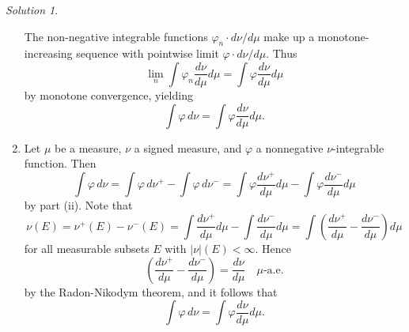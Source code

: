 \documentclass{report}
\theoremstyle{remark}
\newtheorem*{solution}{Solution}
\begin{document}
\begin{solution}
\begin{enumerate}[label=(\roman*)]
      The non-negative integrable functions $\varphi_n \cdot d\nu/d\mu$ make up a monotone-increasing sequence with pointwise limit $\varphi \cdot d\nu/d\mu$. Thus
      \begin{equation*}
        \lim_n \int \varphi_n \frac{d\nu}{d\mu} d\mu = \int \varphi \frac{d\nu}{d\mu} d\mu
      \end{equation*}
      by monotone convergence, yielding
      \begin{equation*}
        \int \varphi \, d\nu = \int \varphi \frac{d\nu}{d\mu} d\mu.
      \end{equation*}

    \item Let $\mu$ be a measure, $\nu$ a signed measure, and $\varphi$ a nonnegative $\nu$-integrable function. Then
      \begin{equation*}
        \int \varphi \, d\nu = \int \varphi \, d\nu^+ - \int \varphi \, d\nu^- = \int \varphi \frac{d\nu^+}{d\mu} d\mu - \int \varphi \frac{d\nu^-}{d\mu} d\mu
      \end{equation*}
      by part (ii). Note that
      \begin{equation*}
        \nu(E) = \nu^+(E) - \nu^-(E) = \int \frac{d\nu^+}{d\mu} d\mu - \int \frac{d\nu^-}{d\mu} d\mu = \int \left( \frac{d\nu^+}{d\mu} - \frac{d\nu^-}{d\mu} \right) d\mu
      \end{equation*}
      for all measurable subsets $E$ with $|\nu|(E) < \infty$. Hence
      \begin{equation*}
        \left( \frac{d\nu^+}{d\mu} - \frac{d\nu^-}{d\mu} \right) = \frac{d\nu}{d\mu} \quad \text{$\mu$-a.e.}
      \end{equation*}
      by the Radon-Nikodym theorem, and it follows that
      \begin{equation*}
        \int \varphi \, d\nu = \int \varphi \frac{d\nu}{d\mu} d\mu.
      \end{equation*}


\end{enumerate}
\end{solution}
\end{document}
